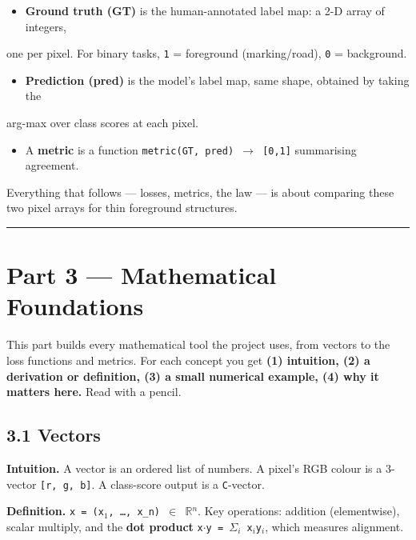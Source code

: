 \documentclass[11pt]{article}
\begin{document}
\begin{itemize}\setlength{\itemsep}{1pt}
\item \textbf{Ground truth (GT)} is the human-annotated label map: a 2-D array of integers,
\end{itemize}
  one per pixel. For binary tasks, \texttt{1} = foreground (marking/road), \texttt{0} = background.
\begin{itemize}\setlength{\itemsep}{1pt}
\item \textbf{Prediction (pred)} is the model's label map, same shape, obtained by taking the
\end{itemize}
  arg-max over class scores at each pixel.
\begin{itemize}\setlength{\itemsep}{1pt}
\item A \textbf{metric} is a function \texttt{metric(GT, pred) $\rightarrow$ [0,1]} summarising agreement.
\end{itemize}

Everything that follows --- losses, metrics, the law --- is about comparing these two pixel arrays for thin foreground structures.

\vspace{3pt}\hrule\vspace{3pt}
\clearpage\section*{Part 3 --- Mathematical Foundations}

This part builds every mathematical tool the project uses, from vectors to the loss functions and metrics. For each concept you get \textbf{(1) intuition, (2) a derivation or definition, (3) a small numerical example, (4) why it matters here.} Read with a pencil.

\subsection*{3.1 Vectors}

\textbf{Intuition.} A vector is an ordered list of numbers. A pixel's RGB colour is a 3-vector \texttt{[r, g, b]}. A class-score output is a \texttt{C}-vector.

\textbf{Definition.} \texttt{x = (x$_{1}$, \ldots{}, x\_n) $\in$ $\mathbb{R}$$^{n}$}. Key operations: addition (elementwise), scalar multiply, and the \textbf{dot product} \texttt{x$\cdot$y = $\Sigma$$_{i}$ x$_{i}$y$_{i}$}, which measures alignment.
\end{document}
